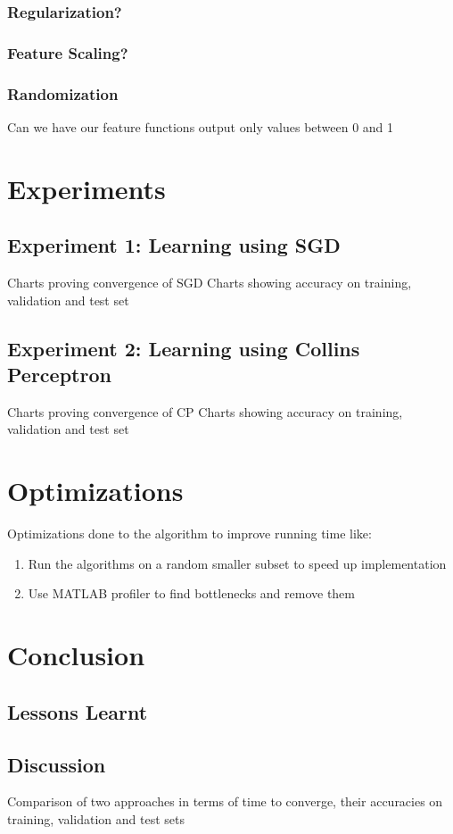 \documentclass{acm_proc_article-sp}
\begin{document}
\subsubsection{Regularization?}
\subsubsection{Feature Scaling?}
\subsubsection{Randomization}
Can we have our feature functions output only values between 0 and 1
\section{Experiments}
\subsection{Experiment 1: Learning using SGD}
Charts proving convergence of SGD
Charts showing accuracy on training, validation and test set
\subsection{Experiment 2: Learning using Collins Perceptron}
Charts proving convergence of CP
Charts showing accuracy on training, validation and test set
\section{Optimizations}
Optimizations done to the algorithm to improve running time like:
\begin{enumerate}
\item Run the algorithms on a random smaller subset to speed up implementation
\item Use MATLAB profiler to find bottlenecks and remove them
\end{enumerate}
\section{Conclusion}
\subsection{Lessons Learnt}
\subsection{Discussion}
Comparison of two approaches in terms of time to converge, their accuracies on training, validation and test sets
%

 
\end{document}

